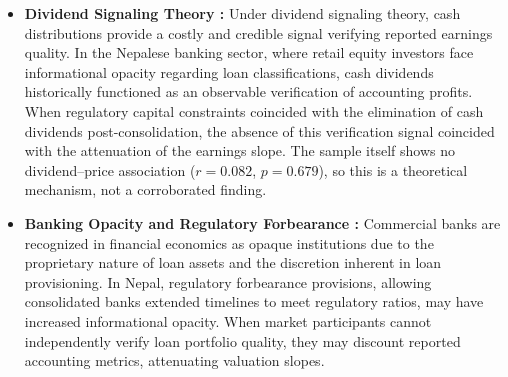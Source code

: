 \begin{itemize}
    \item \textbf{Dividend Signaling Theory \citep{bhattacharya1979,john1985}:}
    Under dividend signaling theory, cash distributions provide a costly and credible signal verifying reported earnings quality. In the Nepalese banking sector, where retail equity investors face informational opacity regarding loan classifications, cash dividends historically functioned as an observable verification of accounting profits. When regulatory capital constraints coincided with the elimination of cash dividends post-consolidation, the absence of this verification signal coincided with the attenuation of the earnings slope. The sample itself shows no dividend--price association ($r = 0.082$, $p = 0.679$), so this is a theoretical mechanism, not a corroborated finding.
    \item \textbf{Banking Opacity and Regulatory Forbearance \citep{morgan2002,flannery2004}:}
    Commercial banks are recognized in financial economics as opaque institutions due to the proprietary nature of loan assets and the discretion inherent in loan provisioning. In Nepal, regulatory forbearance provisions, allowing consolidated banks extended timelines to meet regulatory ratios, may have increased informational opacity. When market participants cannot independently verify loan portfolio quality, they may discount reported accounting metrics, attenuating valuation slopes.
\end{itemize}

